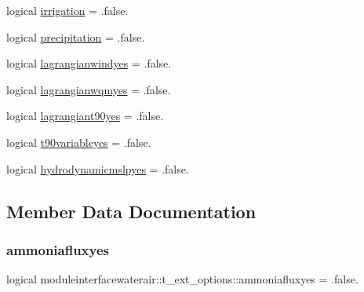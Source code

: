 \begin{DoxyCompactItemize}
\item 
logical \mbox{\hyperlink{structmoduleinterfacewaterair_1_1t__ext__options_a001edc251213b73c76fce1a96941d953}{irrigation}} = .false.
\item 
logical \mbox{\hyperlink{structmoduleinterfacewaterair_1_1t__ext__options_ac04624766cb32ac6002dc018f0d66d9b}{precipitation}} = .false.
\item 
logical \mbox{\hyperlink{structmoduleinterfacewaterair_1_1t__ext__options_ab5e4006a03d90428ed421f284ea8717a}{lagrangianwindyes}} = .false.
\item 
logical \mbox{\hyperlink{structmoduleinterfacewaterair_1_1t__ext__options_afba50d5c9b49c3400fb9e7274ee6b631}{lagrangianwqmyes}} = .false.
\item 
logical \mbox{\hyperlink{structmoduleinterfacewaterair_1_1t__ext__options_a8fe1777ffcf97ff8c4c7514060b3bf45}{lagrangiant90yes}} = .false.
\item 
logical \mbox{\hyperlink{structmoduleinterfacewaterair_1_1t__ext__options_aea73c018a1c55e1ac1190ee8b2f443a9}{t90variableyes}} = .false.
\item 
logical \mbox{\hyperlink{structmoduleinterfacewaterair_1_1t__ext__options_ae63b5dda7d46fca2bfeb1f595424c21e}{hydrodynamicmslpyes}} = .false.
\end{DoxyCompactItemize}


\subsection{Member Data Documentation}
\mbox{\label{structmoduleinterfacewaterair_1_1t__ext__options_a0fbe9a796f0480207430154586a55424}} 
\subsubsection{\texorpdfstring{ammoniafluxyes}{ammoniafluxyes}}
{\footnotesize\ttfamily logical moduleinterfacewaterair\+::t\+\_\+ext\+\_\+options\+::ammoniafluxyes = .false.\hspace{0.3cm}{\ttfamily [private]}}

\mbox{\label{structmoduleinterfacewaterair_1_1t__ext__options_a907fc8c5da35c963b6255d62e1fb740e}} 
